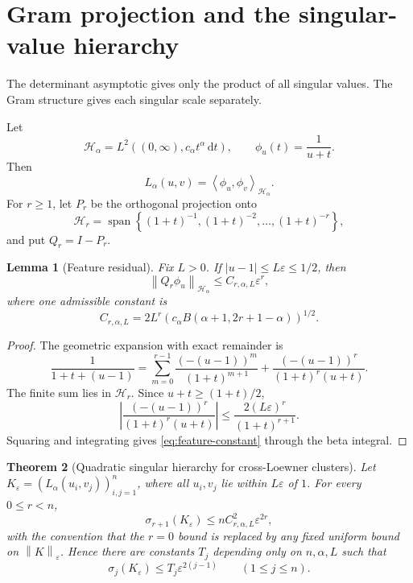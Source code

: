 \documentclass[11pt,oneside]{article}
\newtheorem{theorem}{Theorem}[section]
\newtheorem{lemma}[theorem]{Lemma}
\theoremstyle{definition}
\theoremstyle{remark}
\newcommand{\dd}{\,\mathrm{d}}
\newcommand{\norm}[1]{\left\lVert #1\right\rVert}
\newcommand{\abs}[1]{\left\lvert #1\right\rvert}
\newcommand{\inner}[2]{\left\langle #1,#2\right\rangle}
\newcommand{\set}[1]{\left\{#1\right\}}
\newcommand{\eps}{\varepsilon}
\begin{document}
\section{Gram projection and the singular-value hierarchy}
\label{sec:loewner-singular}

The determinant asymptotic gives only the product of all singular values.  The Gram structure gives each singular scale separately.

Let
\begin{equation}
 \mathcal H_\alpha=L^2((0,\infty),c_\alpha t^\alpha\dd t),
 \qquad
 \phi_u(t)=\frac1{u+t}.
 \label{eq:feature-space}
\end{equation}
Then
\begin{equation}
 L_\alpha(u,v)=\inner{\phi_u}{\phi_v}_{\mathcal H_\alpha}.
 \label{eq:Gram}
\end{equation}
For $r\ge1$, let $P_r$ be the orthogonal projection onto
\begin{equation}
 \mathcal H_r=\operatorname{span}\set{(1+t)^{-1},(1+t)^{-2},\dots,(1+t)^{-r}},
 \label{eq:Hr}
\end{equation}
and put $Q_r=I-P_r$.

\begin{lemma}[Feature residual]
\label{lem:feature-residual}
Fix $L>0$.  If $|u-1|\le L\eps\le1/2$, then
\begin{equation}
 \norm{Q_r\phi_u}_{\mathcal H_\alpha}
 \le C_{r,\alpha,L}\eps^r,
 \label{eq:feature-residual}
\end{equation}
where one admissible constant is
\begin{equation}
 C_{r,\alpha,L}
 =2L^r\left(c_\alpha B(\alpha+1,2r+1-\alpha)\right)^{1/2}.
 \label{eq:feature-constant}
\end{equation}
\end{lemma}

\begin{proof}
The geometric expansion with exact remainder is
\[
 \frac1{1+t+(u-1)}
 =\sum_{m=0}^{r-1}\frac{(-(u-1))^m}{(1+t)^{m+1}}
 +\frac{(-(u-1))^r}{(1+t)^r(u+t)}.
\]
The finite sum lies in $\mathcal H_r$.  Since $u+t\ge(1+t)/2$,
\[
 \abs{\frac{(-(u-1))^r}{(1+t)^r(u+t)}}
 \le\frac{2(L\eps)^r}{(1+t)^{r+1}}.
\]
Squaring and integrating gives \eqref{eq:feature-constant} through the beta integral.
\end{proof}

\begin{theorem}[Quadratic singular hierarchy for cross-Loewner clusters]
\label{thm:loewner-singular-hierarchy}
Let $K_\eps=(L_\alpha(u_i,v_j))_{i,j=1}^n$, where all $u_i,v_j$ lie within $L\eps$ of $1$.  For every $0\le r<n$,
\begin{equation}
 \sigma_{r+1}(K_\eps)
 \le n C_{r,\alpha,L}^2\eps^{2r},
 \label{eq:loewner-singular-hierarchy}
\end{equation}
with the convention that the $r=0$ bound is replaced by any fixed uniform bound on $\norm K_\eps$.  Hence there are constants $T_j$ depending only on $n,\alpha,L$ such that
\begin{equation}
 \boxed{\sigma_j(K_\eps)\le T_j\eps^{2(j-1)}
 \qquad(1\le j\le n).}
 \label{eq:sigma-hierarchy}
\end{equation}
\end{theorem}
\end{document}
